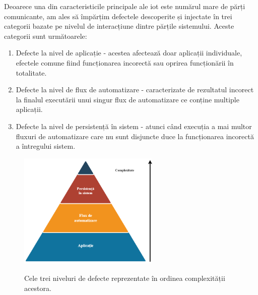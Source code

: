 Deoarece una din caracteristicile principale ale \acrshort{iot} este numărul mare de părți comunicante, am ales să împărțim defectele descoperite și injectate în trei categorii bazate pe nivelul de interacțiune dintre părțile sistemului. Aceste categorii sunt următoarele:

\begin{enumerate}
    \item Defecte la nivel de aplicație - acestea afectează doar aplicații individuale, efectele comune fiind funcționarea incorectă sau oprirea funcționării în totalitate.
    \item Defecte la nivel de flux de automatizare - caracterizate de rezultatul incorect la finalul executării unui singur flux de automatizare ce conține multiple aplicații.
    \item Defecte la nivel de persistență în sistem - atunci când execuția a mai multor fluxuri de automatizare care nu sunt disjuncte duce la funcționarea incorectă a întregului sistem.
\end{enumerate}

\begin{figure}[h]
    \centering
    \caption{\centering Cele trei niveluri de defecte reprezentate în ordinea complexității acestora.}
    \includegraphics[width=0.6\textwidth]{images/niveluri_defecte.drawio (1).png}
    \label{fig:bug_levels}
\end{figure}

